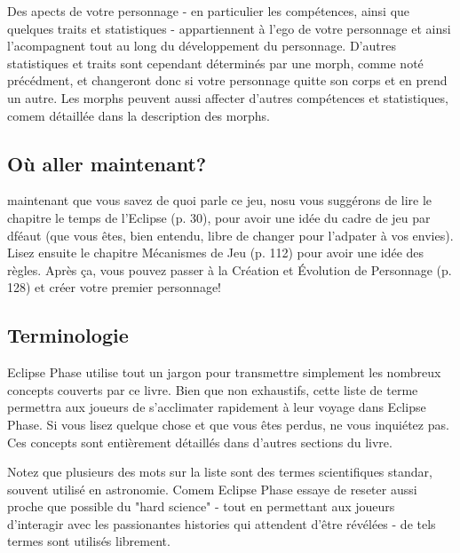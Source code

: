 Des apects de votre personnage - en particulier les compétences, ainsi que quelques traits et statistiques - appartiennent à l'ego de votre personnage et ainsi l'acompagnent tout au long du développement du personnage. D'autres statistiques et traits sont cependant déterminés par une morph, comme noté précédment, et changeront donc si votre personnage quitte son corps et en prend un autre. Les morphs peuvent aussi affecter d'autres compétences et statistiques, comem détaillée dans la description des morphs. 



\subsection{Où aller maintenant?} \label{sec:where-go-from} 

maintenant que vous savez de quoi parle ce jeu, nosu vous suggérons de lire le chapitre le temps de l'Eclipse (p. 30), pour avoir une idée du cadre de jeu par dféaut (que vous êtes, bien entendu, libre de changer pour  l'adpater à vos envies). Lisez ensuite le chapitre Mécanismes de Jeu (p. 112) pour avoir une idée des règles. Après ça, vous pouvez passer à la Création et Évolution de Personnage (p. 128) et créer votre premier personnage! 



\subsection{Terminologie} \label{sec:terminology} 

Eclipse Phase utilise tout un jargon pour transmettre simplement les nombreux concepts couverts par ce livre. Bien que non exhaustifs, cette liste de terme permettra aux joueurs de s'acclimater rapidement à leur voyage dans Eclipse Phase. Si vous lisez quelque chose et que vous êtes perdus, ne vous inquiétez pas. Ces concepts sont entièrement détaillés dans d'autres sections du livre. 

Notez que plusieurs des mots sur la liste sont des termes scientifiques standar, souvent utilisé en astronomie. Comem Eclipse Phase essaye de reseter aussi proche que possible du "hard science" - tout en permettant aux joueurs d'interagir avec les passionantes histories qui attendent d'être révélées - de tels termes sont utilisés librement. 

